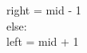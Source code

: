 \documentclass[preview]{standalone}
\begin{document}
right = mid - 1\\else:\\left = mid + 1\\
\end{document}
